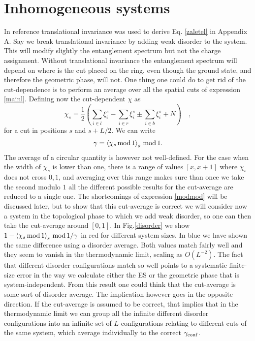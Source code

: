 \documentclass[twocolumn,amsmath,longbibliography,amssymb,superscriptaddress]{revtex4-1}
\begin{document}
\section{Inhomogeneous systems}

In reference \cite{Zaletel2014} translational invariance was used to derive Eq. \ref{zaletel} in Appendix A. Say we break translational invariance by adding weak disorder to the system. This will modify slightly the entanglement spectrum but not the charge assignment. Without translational invariance the entanglement spectrum will depend on where is the cut placed on the ring, even though the ground state, and therefore the geometric phase, will not. One thing one could do to get rid of the cut-dependence is to perform an average over all the spatial cuts of expression \ref{mainl}. Defining now the cut-dependent $\chi$ as 
\begin{equation*}
\chi_s = \frac{1}{2} \left( \sum_{i\in l}\xi^s_i-\sum_{i\in r}\xi^s_i \pm \sum_{i\in b}\xi^s_i  + N \right) \quad,
\end{equation*}
for a cut in positions $s$ and $s+L/2$. We can write
\begin{equation}
\gamma = \expval{\chi_s \, {\rm mod}\, 1}_s \, {\rm mod}\, 1.
\label{modmod}
\end{equation}
The average of a circular quantity is however not well-defined. For the case when the width of $\chi_s$ is lower than one, there is a range of values $[x,x+1]$ where $\chi_s$ does not cross $0,1$, and averaging over this range makes sure than once we take the second modulo $1$ all the different possible results for the cut-average are reduced to a single one. The shortcomings of expression \ref{modmod} will be discussed later, but to show that this cut-average is correct we will consider now a system in the topological phase to which we add weak disorder, so one can then take the cut-average around $[0,1]$. In Fig.\ref{disorder} we show $1 - \expval{\chi_s \, {\rm mod}\, 1}_s \, {\rm mod}\, 1 /\gamma$ in red for different system sizes. In blue we have shown the same difference using a disorder average. Both values match fairly well and they seem to vanish in the thermodynamic limit, scaling as $O(L^{-2})$. The fact that different disorder configurations match so well points to a systematic finite-size error in the way we calculate either the ES or the geometric phase that is system-independent. From this result one could think that the cut-average is some sort of disorder average. The implication however goes in the opposite direction. If the cut-average is assumed to be correct, that implies that in the thermodynamic limit we can group all the infinite different disorder configurations into an infinite set of $L$ configurations relating to different cuts of the same system, which average individually to the correct $\gamma_{\rm conf}$.
\end{document}
